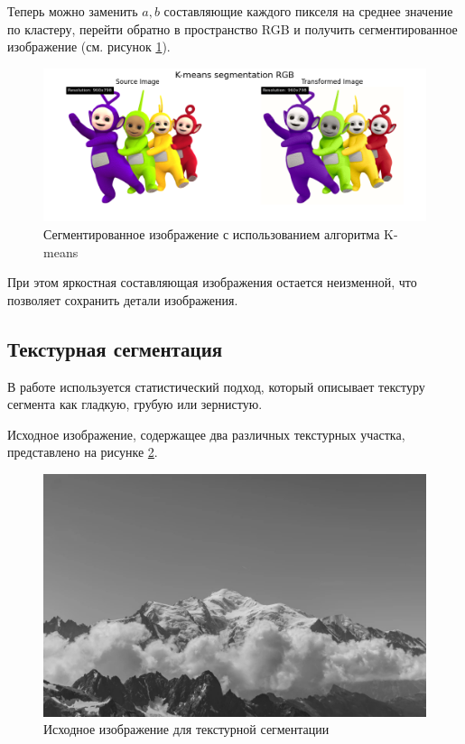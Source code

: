 Теперь можно заменить $a, b$ составляющие каждого пикселя на среднее значение по кластеру, перейти обратно в пространство RGB и получить сегментированное изображение (см. рисунок \ref{img:kmeans_segmentation_RGB}).

\begin{figure}[ht!]
    \centering
    \includegraphics[width=\textwidth]{../results/K-means segmentation RGB.png}
    \caption{Сегментированное изображение с использованием алгоритма K-means}
    \label{img:kmeans_segmentation_RGB}
\end{figure}
При этом яркостная составляющая изображения остается неизменной, что позволяет сохранить детали изображения.

\FloatBarrier
\subsection{Текстурная сегментация}

В работе используется статистический подход, который описывает текстуру сегмента 
как гладкую, грубую или зернистую. 

Исходное изображение, содержащее два различных текстурных участка, представлено на рисунке \ref{img:texture_source}.

\begin{figure}[ht!]
    \centering
    \includegraphics[width=\textwidth]{../mountain.jpeg}
    \caption{Исходное изображение для текстурной сегментации}
    \label{img:texture_source}
\end{figure}


